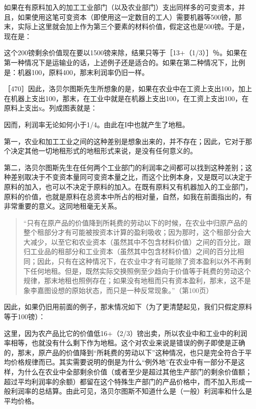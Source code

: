 如果在有原料加入的加工工业部门（以及农业部门）支出同样多的可变资本，并且，如果使用这笔可变资本（即使用这一定数目的工人）需要机器等500镑，那末，实际上这里就会加上作为第三个要素的材料价值，假定这也是500镑。于是，现在是：

\todo{}

这个200镑剩余价值现在要以1500镑来除，结果只等于［13+（1/3）］％。如果在第一种情况下是运输业的话，上述例子还是适合的。如果在第二种情况下，比例是：机器100，原料400，那末利润率仍旧一样。

［470］因此，洛贝尔图斯先生所想象的是，如果在农业中在工资上支出100，加上在机器上支出100，那末，在工业中就是在机器上支出100，在工资上支出100，在原料上支出x。列成图表就是：

\todo{}

因而，利润率无论如何小于1/4。由此在I中也就产生了地租。

第一，农业和加工工业之间的这种差别是想象出来的，并不存在；因此，它对于那个决定其他一切地租形式的地租形式来说，是没有任何意义的。

第二，洛贝尔图斯先生在任何两个工业部门的利润率之间都可以找到这种差别；这种差别取决于不变资本量同可变资本量之比，而这个比例本身，又是既可以决定于原料的加入，也可以不决定于原料的加入。在既有原料又有机器加入的工业部门，原料的价值，也就是原料在总资本中所占的相对量，自然，如我在前面指出的，有非常重要的意义。这同地租毫无关系。

\begin{quote}{“只有在原产品的价值降到所耗费的劳动以下的时候，在农业中归原产品的整个租部分才有可能被按资本计算的盈利吸收；因为那时，这个租部分会大大减少，以至它和农业资本（虽然其中不包含材料价值）之间的百分比，跟归工业品的租部分和工业资本（虽然其中包含材料价值）之间的百分比相同；因此，只有在这种情况下，在农业中才有可能除了资本盈利以外不再剩下任何地租。但是，既然实际交换照例至少趋向于价值等于耗费的劳动这个规律，那末地租也照例存在；如果没有地租而只有资本盈利，那末，这不是象李嘉图设想的原始状态，而只是一种反常现象。”（第100页）}\end{quote}

因此，如果仍旧用前面的例子，那末情况如下（为了更清楚起见，我们只假定原料等于100镑）：

\todo{}

这里，因为农产品比它的价值低16+（2/3）镑出卖，所以农业中和工业中的利润率相等，也就没有什么剩下作为地租。这个对农业来说是错误的例子即使是正确的，那末，原产品的价值降到“所耗费的劳动以下”这种情况，也只是完全符合于平均价格规律而已。其实需要说明的倒是为什么“例外地”在农业中有一部分不是这样，为什么在农业中全部剩余价值（或者至少是超过其他生产部门的剩余价值额；超过平均利润率的余额）都留在这个特殊生产部门的产品价格中，而不加入形成一般利润率的总结算。由此可见，洛贝尔图斯不知道什么是（一般）利润率和什么是平均价格。

